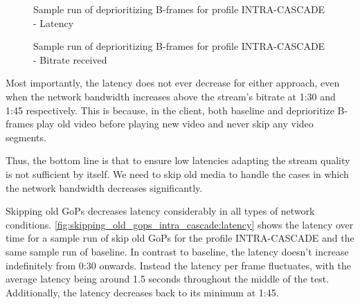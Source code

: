 \begin{figure}
    \centering
    
    \caption{Sample run of deprioritizing B-frames for profile INTRA-CASCADE - Latency}
    \label{fig:deprioritizing_b_frames_intra_cascade:latency}
\end{figure}

\begin{figure}
    \centering
    
    \caption{Sample run of deprioritizing B-frames for profile INTRA-CASCADE - Bitrate received}
    \label{fig:deprioritizing_b_frames_intra_cascade:bitrate_received}
\end{figure}

Most importantly, the latency does not ever decrease for either approach, even when the network bandwidth increases above
the stream's bitrate at 1:30 and 1:45 respectively. This is because, in the client, both baseline and deprioritize B-frames
play old video before playing new video and never skip any video segments. 


Thus, the bottom line is that to ensure low latencies adapting the stream quality is not sufficient by itself. %
We need to skip old media to handle the cases in which the network bandwidth decreases significantly.

Skipping old GoPs decreases latency considerably in all types of network conditions. \autoref{fig:skipping_old_gops_intra_cascade:latency} shows the latency over time for a sample run of skip old GoPs for the profile INTRA-CASCADE and the same sample run of baseline. In contrast to baseline, the latency doesn't increase indefinitely from 0:30 onwards. Instead the latency per frame fluctuates, with the average latency being around
1.5 seconds throughout the middle of the test. Additionally, the latency decreases back to its minimum at 1:45.

